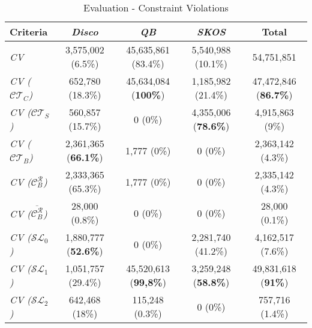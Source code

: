 \documentclass{llncs}
\begin{document}
{\begin{table}[H]
		\scriptsize
    \begin{center}
    \begin{tabular}{@{}lcccc@{}}
    \\       \textbf{Criteria}
           & \textbf{\emph{Disco}}
           & \textbf{\emph{QB}}
					 & \textbf{\emph{SKOS}}
					 & \textbf{Total}
    \\ \midrule
		\emph{CV} & 3,575,002 (6.5\%) & 45,635,861 (83.4\%) & 5,540,988 (10.1\%) & 54,751,851 \\
		\hline
		\emph{CV (}$\mathcal{CT}_{C}$\emph{)} & 652,780 (18.3\%) & 45,634,084 (\textbf{100\%}) & 1,185,982 (21.4\%) & 47,472,846 (\textbf{86.7\%}) \\
		\emph{CV (}$\mathcal{CT}_{S}$\emph{)} & 560,857 (15.7\%) & 0 (0\%) & 4,355,006 (\textbf{78.6\%}) & 4,915,863 (9\%) \\
		\emph{CV (}$\mathcal{CT}_{B}$\emph{)} & 2,361,365 (\textbf{66.1\%}) & 1,777 (0\%) & 0 (0\%) & 2,363,142 (4.3\%) \\
		\hline
		\emph{CV (}$\mathcal{C}_B ^{\mathcal{R}}$\emph{)} & 2,333,365 (65.3\%) & 1,777 (0\%) & 0 (0\%) & 2,335,142 (4.3\%) \\
		\emph{CV (}$\overline{\mathcal{C}_B ^{\mathcal{R}}}$\emph{)} & 28,000 (0.8\%) & 0 (0\%) & 0 (0\%) & 28,000 (0.1\%) \\
		\hline
		\emph{CV ($\mathcal{SL}_{0}$)} & 1,880,777 (\textbf{52.6\%}) & 0 (0\%) & 2,281,740 (41.2\%) & 4,162,517 (7.6\%) \\
		\emph{CV ($\mathcal{SL}_{1}$)} & 1,051,757 (29.4\%) & 45,520,613 (\textbf{99,8\%}) & 3,259,248 (\textbf{58.8\%}) & 49,831,618 (\textbf{91\%}) \\
		\emph{CV ($\mathcal{SL}_{2}$)} & 642,468 (18\%) & 115,248 (0.3\%) & 0 (0\%) & 757,716 (1.4\%) \\
    \bottomrule
    \end{tabular}
    \caption{Evaluation - Constraint Violations}
		\label{tab:evaluation-constraint-violations}
    \end{center}
\end{table}

}
\end{document}

